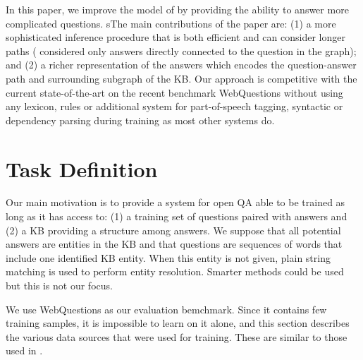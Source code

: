 \documentclass[runningheads,a4paper]{llncs}
\newcommand{\wq}{{\sc WebQuestions}\xspace}
\begin{document}
In this paper, we improve the model of \cite{bordes2014open} by
providing the ability to answer more complicated questions. 
sThe main contributions of the paper are: (1) a more sophisticated 
inference procedure that is both efficient and can consider longer paths (\cite{bordes2014open} considered only answers directly connected to the question in the graph); and (2) a richer
representation of the answers which encodes the question-answer path and surrounding
subgraph of the KB. 
Our approach is competitive with the current state-of-the-art 
on the recent benchmark \wq
\cite{berant-EtAl:2013:EMNLP} without using any lexicon, rules or additional 
system for part-of-speech tagging, syntactic or dependency parsing
during training as most other systems do.






\section{Task Definition} \label{data}


Our main motivation is to provide a system for open QA able to be
trained as long as it has access to: (1) a training set of questions
paired with answers and (2) a KB providing a structure among answers.
We suppose that all potential answers are entities in the KB and that
questions are sequences of words that include one identified KB
entity. When this entity is not given, plain string matching is used to
perform entity resolution. Smarter methods could be used but
this is not our focus.


We use \wq \cite{berant-EtAl:2013:EMNLP} as our evaluation
bemchmark.
Since it contains few training samples, it is impossible to learn on
it alone, and this section describes the various data sources that
were used for training. These are similar to those used in
\cite{berant2014semantic}.
\end{document}
